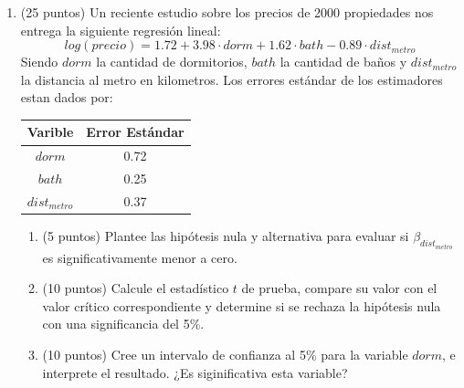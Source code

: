 \documentclass[10pt,a4paper]{article}
\begin{document}
\begin{enumerate}
    \item (25 puntos) Un reciente estudio sobre los precios de 2000 propiedades nos entrega la siguiente regresión lineal:
    $$log(precio) = 1.72 + 3.98\cdot dorm + 1.62\cdot bath - 0.89 \cdot dist_{metro}$$ 
    Siendo $dorm$ la cantidad de dormitorios, $bath$ la cantidad de baños y $dist_{metro}$ la distancia al metro en kilometros. Los errores estándar de los estimadores estan dados por:
    \begin{center}
        \begin{table}[H]
            \centering
            \begin{tabular}{|c|c|}
            \hline
                Varible & Error Estándar \\
                \hline
                $dorm$ & 0.72 \\
                \hline
                $bath$ & 0.25 \\
                \hline
                $dist_{metro}$ & 0.37 \\
                \hline
            \end{tabular}
        \end{table}
    \end{center}
        \begin{enumerate}
          \item (5 puntos) Plantee las hipótesis nula y alternativa para evaluar si
                \( \beta_{dist_{metro}} \) es significativamente menor a cero.
          \item (10 puntos) Calcule el estadístico \( t \) de prueba, compare su valor
                con el valor crítico correspondiente y determine si se
                rechaza la hipótesis nula con una significancia del 5\%.
            \item (10 puntos) Cree un intervalo de confianza al 5\% para la variable $dorm$, e interprete el resultado. ¿Es siginificativa esta variable?
        \end{enumerate}



\end{enumerate}
\end{document}
